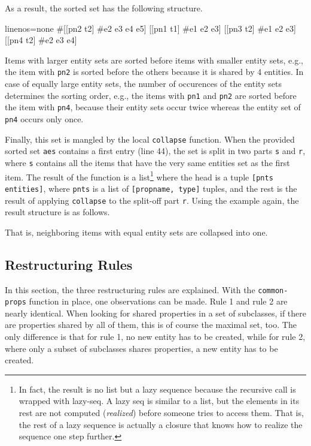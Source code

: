 \documentclass[11pt]{article}
\begin{document}
As a result, the sorted set has the following structure.

\begin{clojurecode*}{linenos=none}
#{[[pn2 t2] #{e2 e3 e4 e5}]
  [[pn1 t1] #{e1 e2 e3}]
  [[pn3 t2] #{e1 e2 e3}]
  [[pn4 t2] #{e2 e3 e4}]}
\end{clojurecode*}

Items with larger entity sets are sorted before items with smaller entity sets,
e.g., the item with \verb|pn2| is sorted before the others because it is shared
by 4 entities.  In case of equally large entity sets, the number of occurences
of the entity sets determines the sorting order, e.g., the items with
\verb|pn1| and \verb|pn2| are sorted before the item with \verb|pn4|, because
their entity sets occur twice whereas the entity set of \verb|pn4| occurs only
once.

Finally, this set is mangled by the local \verb|collapse| function.  When the
provided sorted set \verb|aes| contains a first entry (line 44), the set is
split in two parts \verb|s| and \verb|r|, where \verb|s| contains all the items
that have the very same entities set as the first item.  The result of the
function is a list\footnote{In fact, the result is no list but a lazy sequence
  because the recursive call is wrapped with \textsf{lazy-seq}.  A lazy seq is
  similar to a list, but the elements in its rest are not computed
  (\emph{realized}) before someone tries to access them.  That is, the rest of
  a lazy sequence is actually a closure that knows how to realize the sequence
  one step further.}  where the head is a tuple \verb|[pnts entities]|, where
\verb|pnts| is a list of \verb|[propname, type]| tuples, and the rest is the
result of applying \verb|collapse| to the split-off part \verb|r|.  Using the
example again, the result structure is as follows.

\begin{clojurecode*}{linenos=none}
([([pn2 t2])          #{e2 e3 e4 e5}]
 [([pn1 t1] [pn3 t2]) #{e1 e2 e3}]
 [([pn4 t2])          #{e2 e3 e4}]}
\end{clojurecode*}

That is, neighboring items with equal entity sets are collapsed into one.


\subsection{Restructuring Rules}
\label{sec:restructuring-rules}

In this section, the three restructuring rules are explained.  With the
\verb|common-props| function in place, one observations can be made.  Rule 1
and rule 2 are nearly identical.  When looking for shared properties in a set
of subclasses, if there are properties shared by all of them, this is of course
the maximal set, too.  The only difference is that for rule 1, no new entity
has to be created, while for rule 2, where only a subset of subclasses shares
properties, a new entity has to be created.
\end{document}
